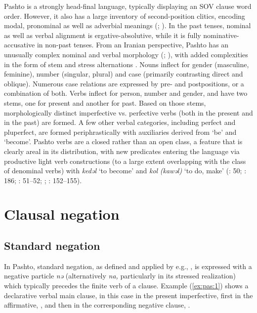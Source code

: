 \documentclass[output=paper,colorlinks,citecolor=brown]{langscibook}
\begin{document}
Pashto is a strongly head-final language, typically displaying an SOV clause word order. However, it also has a large inventory of second-position clitics, encoding modal, pronominal as well as adverbial meanings (\citealt{Tegey1977}; \citealt{Pate2012}). In the past tenses, nominal as well as verbal alignment is ergative-absolutive, while it is fully nominative-accusative in non-past tenses. From an Iranian perspective, Pashto has an unusually complex nominal and verbal morphology  (\citealt{MacKenzie2009}; \citealt[111]{Grjunberg1987}), with added complexities in the form of stem and stress alternations \citep[111]{Morgenstierne1942}. Nouns inflect for gender (masculine, feminine), number (singular, plural) and case (primarily contrasting direct and oblique). Numerous case relations are expressed by pre- and postpositions, or a combination of both. Verbs inflect for person, number and gender, and have two stems, one for present and another for past. Based on those stems, morphologically distinct imperfective vs. perfective verbs (both in the present and in the past) are formed. A few other verbal categories, including perfect and pluperfect, are formed periphrastically with auxiliaries derived from ‘be’ and ‘become’. Pashto verbs are a closed rather than an open class, a feature that is clearly areal in its distribution, with new predicates entering the language via productive light verb constructions (to a large extent overlapping with the class of denominal verbs) with \textit{kedəl} ‘to become’ and \textit{kol} \textit{(kawəl)} ‘to do, make’ (\citealt{Butt2010}: 50; \citealt{DavidGoodman2014}: 186; \citealt{Liljegren2010}: 51–52; \citealt{Masica1993}; \citealt{Wohlgemuth2009}: 152–155).


\section{Clausal negation}\label{sec:pas:2}

\subsection{Standard negation}\label{sec:pas:2.1}

In Pashto, standard negation, as defined and applied by e.g., \citet{Miestamo2005}, is expressed with a negative particle \textit{nə} (alternatively \textit{na,} particularly in its stressed realization) which typically precedes the finite verb of a clause. Example (\ref{ex:pas:1}) shows a declarative verbal main clause, in this case in the present imperfective, first in the affirmative, , and then in the corresponding negative clause, . 
\end{document}
